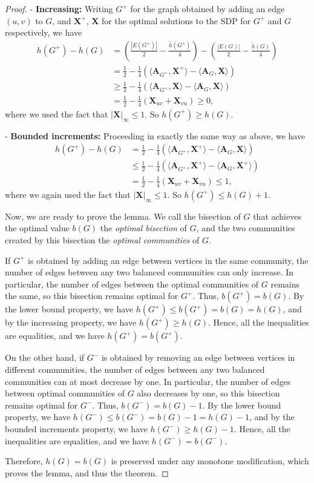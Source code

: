 \documentclass[11pt, titlepage]{article} %
\numberwithin{equation}{section}
\theoremstyle{definition}
\numberwithin{theorem}{section}
\numberwithin{lemma}{section}
\numberwithin{corollary}{section}
\numberwithin{proposition}{section}
\numberwithin{definition}{section}
\numberwithin{remark}{section}
\begin{document}
\begin{proof}
- \textbf{Increasing:} Writing $G^+$ for the graph obtained by adding an edge $(u,v)$ to $G$, 
and $\bm{X}^+$, $\bm{X}$ for the optimal solutions to the SDP for $G^+$ and $G$ respectively, we have
\begin{align*}
h(G^+) - h(G) &= \left(\frac{|E(G^+)|}{2} - \frac{\tilde{h}(G^+)}{4}\right) 
- \left(\frac{|E(G)|}{2} - \frac{\tilde{h}(G)}{4}\right)\\
&= \frac{1}{2} - \frac{1}{4} \left(\langle \bm{A}_{G^+}, \bm{X}^+ \rangle - \langle \bm{A}_G, \bm{X} \rangle\right)\\
&\geq \frac{1}{2} - \frac{1}{4} \left(\langle \bm{A}_{G^+}, \bm{X} \rangle - \langle \bm{A}_G, \bm{X} \rangle\right)\\
&= \frac{1}{2} - \frac{1}{4} (\bm{X}_{uv} + \bm{X}_{vu}) \geq 0,
\end{align*}
where we used the fact that $|\bm{X}|_\infty \leq 1$. So $h(G^+) \geq h(G)$.

- \textbf{Bounded increments:} Proceeding in exactly the same way as above, we have
\begin{align*}
h(G^+) - h(G) &= \frac{1}{2} - \frac{1}{4} \left(\langle \bm{A}_{G^+}, \bm{X}^+ \rangle 
- \langle \bm{A}_G, \bm{X} \rangle\right)\\
&\leq \frac{1}{2} - \frac{1}{4} \left(\langle \bm{A}_{G^+}, \bm{X^+} \rangle - \langle \bm{A}_G, \bm{X^+} \rangle\right)\\
&= \frac{1}{2} - \frac{1}{4} (\bm{X}_{uv} + \bm{X}_{vu}) \leq 1,
\end{align*}
where we again used the fact that $|\bm{X}|_\infty \leq 1$. So $h(G^+) \leq h(G) + 1$.

Now, we are ready to prove the lemma. We call the bisection of $G$ that achieves the optimal value
$b(G)$ the \emph{optimal bisection} of $G$, and the two communities created by this bisection the 
\emph{optimal communities} of $G$.

If $G^+$ is obtained by adding an edge between vertices in the
same community, the number of edges between any two balanced communities can only increase. 
In particular, the number of edges between the optimal communities of $G$ remains the same, 
so this bisection remains optimal for $G^+$. Thus, $b(G^+) = b(G)$.
By the lower bound property, we have $h(G^+) \leq b(G^+) = b(G) = h(G)$, and by the increasing
property, we have $h(G^+) \geq h(G)$. Hence, all the inequalities are equalities, and we have 
$h(G^+) = b(G^+)$.

On the other hand, if $G^-$ is obtained by removing an edge between vertices in different communities,
the number of edges between any two balanced communities can at most decrease by one.
In particular, the number of edges between optimal communities of $G$ also decreases by one, so
this bisection remains optimal for $G^-$. Thus, $b(G^-) = b(G) - 1$.
By the lower bound property, we have $h(G^-) \leq b(G^-) = b(G) - 1 = h(G) - 1$, and by the bounded
increments property, we have $h(G^-) \geq h(G) - 1$. Hence, all the inequalities are equalities, 
and we have $h(G^-) = b(G^-)$.

Therefore, $h(G) = b(G)$ is preserved under any monotone modification, which proves the lemma, and thus the theorem.
\end{proof}
\end{document}

